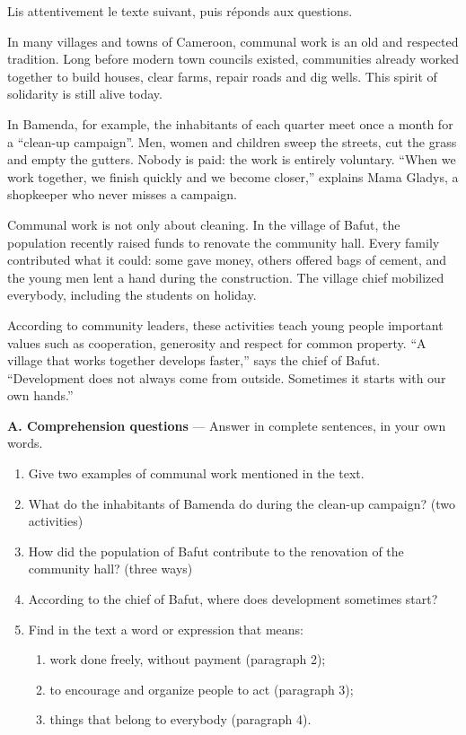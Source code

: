 \documentclass[11pt]{article}
\begin{document}
\begin{exercice}
Lis attentivement le texte suivant, puis réponds aux questions.

\begin{textebox}
In many villages and towns of Cameroon, communal work is an old and respected tradition. Long before modern town councils existed, communities already worked together to build houses, clear farms, repair roads and dig wells. This spirit of solidarity is still alive today.

In Bamenda, for example, the inhabitants of each quarter meet once a month for a “clean-up campaign”. Men, women and children sweep the streets, cut the grass and empty the gutters. Nobody is paid: the work is entirely voluntary. “When we work together, we finish quickly and we become closer,” explains Mama Gladys, a shopkeeper who never misses a campaign.

Communal work is not only about cleaning. In the village of Bafut, the population recently raised funds to renovate the community hall. Every family contributed what it could: some gave money, others offered bags of cement, and the young men lent a hand during the construction. The village chief mobilized everybody, including the students on holiday.

According to community leaders, these activities teach young people important values such as cooperation, generosity and respect for common property. “A village that works together develops faster,” says the chief of Bafut. “Development does not always come from outside. Sometimes it starts with our own hands.”
\end{textebox}

\textbf{A. Comprehension questions} — Answer in complete sentences, in your own words.

\begin{enumerate}
\item Give two examples of communal work mentioned in the text.
\item What do the inhabitants of Bamenda do during the clean-up campaign? (two activities)
\item How did the population of Bafut contribute to the renovation of the community hall? (three ways)
\item According to the chief of Bafut, where does development sometimes start?
\item Find in the text a word or expression that means:
\begin{enumerate}
\item work done freely, without payment (paragraph 2);
\item to encourage and organize people to act (paragraph 3);
\item things that belong to everybody (paragraph 4).
\end{enumerate}
\end{enumerate}


\end{exercice}
\end{document}
